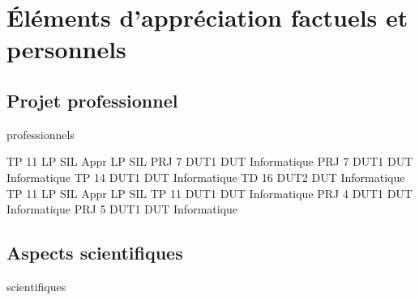 \chapter{Éléments d'appréciation factuels et personnels}
  \section{Projet professionnel}
    \begin{modules}{professionnels}
    \end{modules}

    \begin{enseignements}
                   {TP}
                   {11} %
                   {LP SIL Appr}
                   {LP SIL}
                   {PRJ}
                   {7} %
                   {DUT1}
                   {DUT Informatique}
                   {PRJ}
                   {7} %
                   {DUT1}
                   {DUT Informatique}
                   {TP}
                   {14} %
                   {DUT1}
                   {DUT Informatique}
                   {TD}
                   {16} %
                   {DUT2}
                   {DUT Informatique}
                   {TP}
                   {11} %
                   {LP SIL Appr}
                   {LP SIL}
                   {TP}
                   {11} %
                   {DUT1}
                   {DUT Informatique}
                   {PRJ}
                   {4} %
                   {DUT1}
                   {DUT Informatique}
                   {PRJ}
                   {5} %
                   {DUT1}
                   {DUT Informatique}
    \end{enseignements}

  \section{Aspects scientifiques}
    \begin{modules}{scientifiques}
    \end{modules}

